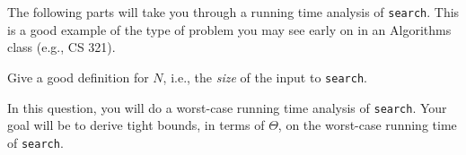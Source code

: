 \documentclass[12pt]{exam}
\begin{document}
\noindent The following parts will take you through a running time analysis of {\tt search}. This is a good example of the type of problem you may see early on in an Algorithms class (e.g., CS 321). 







\clearpage


\begin{questions}


	\question[1] \label{q1} Give a good definition for $N$, i.e., the \emph{size} of the input to {\tt search}.






		
\clearpage







	\question[6] In this question, you will do a worst-case running time analysis of {\tt search}. Your goal will be to derive tight bounds, in terms of $\Theta$, on the worst-case running time of {\tt search}. 
	
\end{questions}
\end{document}
